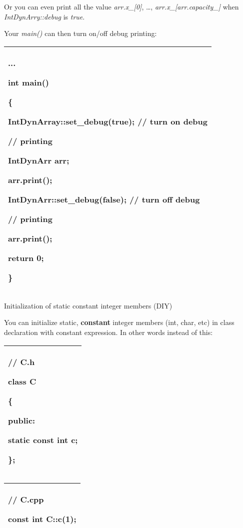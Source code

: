 \documentclass[
]{article}
\begin{document}
Or you can even print all the value \emph{arr.x\_{[}0{]}}, \ldots,
\emph{arr.x\_{[}arr.capacity\_{]}} when \emph{IntDynArry::debug} is
\emph{true}.

Your \emph{main()} can then turn on/off debug printing:

\begin{longtable}[]{@{}l@{}}
\toprule
\endhead
\begin{minipage}[t]{0.97\columnwidth}\raggedright
...

int main()

\{

IntDynArray::set\_debug(true); // turn on debug

// printing

IntDynArr arr;

arr.print();

IntDynArr::set\_debug(false); // turn off debug

// printing

arr.print();

return 0;

\}\strut
\end{minipage}\tabularnewline
\bottomrule
\end{longtable}

Initialization of static constant integer members (DIY)

You can initialize static, \textbf{constant} integer members (int, char,
etc) in class declaration with constant expression. In other words
instead of this:

\begin{longtable}[]{@{}l@{}}
\toprule
\endhead
\begin{minipage}[t]{0.97\columnwidth}\raggedright
// C.h

class C

\{

public:

static const int c;

\};\strut
\end{minipage}\tabularnewline
\bottomrule
\end{longtable}

\begin{longtable}[]{@{}l@{}}
\toprule
\endhead
\begin{minipage}[t]{0.97\columnwidth}\raggedright
// C.cpp

const int C::c(1);\strut
\end{minipage}\tabularnewline
\bottomrule
\end{longtable}
\end{document}
